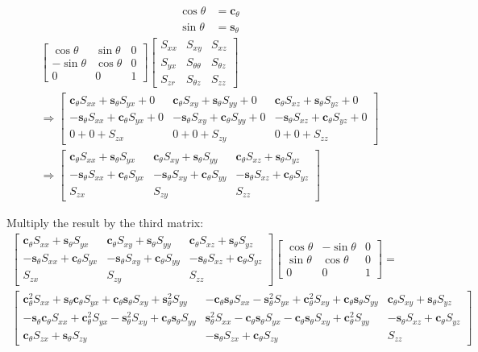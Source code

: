\documentclass{article}
\def\ct{\mathbf{c}_{\theta}}
\def\st{\mathbf{s}_{\theta}}
\def\sxx{S_{xx}}
\def\sxy{S_{xy}}
\def\sxz{S_{xz}}
\def\syx{S_{yx}}
\def\syy{S_{yy}}
\def\syz{S_{yz}}
\def\szx{S_{zx}}
\def\szy{S_{zy}}
\def\szz{S_{zz}}
\begin{document}
\begin{align}
    \cos \theta &= \ct \\
    \sin \theta &= \st 
\end{align}
%
\begin{multline}
    \begin{bmatrix}
        \cos \theta & \sin \theta & 0\\
        -\sin \theta & \cos \theta & 0 \\
        0 & 0 & 1
    \end{bmatrix}
    \begin{bmatrix}
    S_{xx} & S_{xy} & S_{xz} \\
    S_{yx} & S_{\theta\theta} & S_{\theta z} \\
    S_{zr} & S_{\theta z} & S_{zz}
    \end{bmatrix}
    \\
    \Longrightarrow
    \begin{bmatrix}
        \ct\sxx + \st\syx + 0 & \ct\sxy + \st\syy + 0 & \ct\sxz + \st\syz + 0 \\
        -\st\sxx + \ct\syx + 0 & -\st\sxy + \ct\syy + 0 & -\st\sxz + \ct\syz + 0 \\
        0 + 0 + \szx & 0 + 0 + \szy & 0 + 0 + \szz
    \end{bmatrix}
    \\
    \Longrightarrow
    \begin{bmatrix}
        \ct\sxx + \st\syx & \ct\sxy + \st\syy & \ct\sxz + \st\syz \\
        -\st\sxx + \ct\syx & -\st\sxy + \ct\syy & -\st\sxz + \ct\syz \\
        \szx & \szy & \szz
    \end{bmatrix}
\end{multline}

Multiply the result by the third matrix:
\begin{multline}
    \begin{bmatrix}
        \ct\sxx + \st\syx & \ct\sxy + \st\syy & \ct\sxz + \st\syz \\
        -\st\sxx + \ct\syx & -\st\sxy + \ct\syy & -\st\sxz + \ct\syz \\
        \szx & \szy & \szz
    \end{bmatrix}
    \begin{bmatrix}
        \cos \theta & -\sin \theta & 0\\
        \sin \theta & \cos \theta & 0 \\
        0 & 0 & 1
    \end{bmatrix}
    = 
    \\
    \begin{bmatrix}
        \ct^2\sxx + \st\ct\syx + \ct\st\sxy + \st^2\syy & 
        -\ct\st\sxx - \st^2\syx + \ct^2\sxy + \ct\st\syy & 
        \ct\sxy + \st\syz \\
        -\st\ct\sxx + \ct^2\syx - \st^2\sxy + \ct\st\syy & \st^2\sxx - \ct\st\syx - \ct\st\sxy + \ct^2\syy & -\st\sxz + \ct\syz \\
        \ct\szx + \st\szy & -\st\szx + \ct\szy & \szz
    \end{bmatrix}
    \label{eq:something}
\end{multline}
\end{document}
